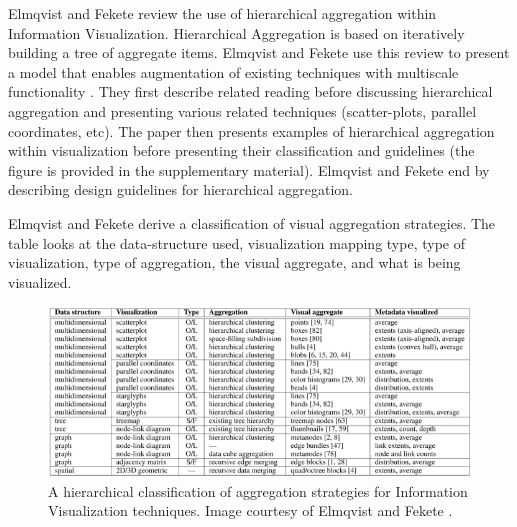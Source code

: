 Elmqvist and Fekete review the use of hierarchical aggregation within Information Visualization. Hierarchical Aggregation is based on iteratively building a tree of aggregate items. Elmqvist and Fekete use this review to present a model that enables augmentation of existing techniques with multiscale functionality \cite{elmqvist2010hierarchical}.
They first describe related reading  before discussing hierarchical aggregation and presenting various related techniques (scatter-plots, parallel coordinates, etc). The paper then presents examples of hierarchical aggregation within visualization before presenting their classification and guidelines (the figure is provided in the supplementary material). Elmqvist and Fekete end by describing design guidelines for hierarchical aggregation.

Elmqvist and Fekete derive a classification of visual aggregation strategies. The table looks at the data-structure used, visualization mapping type, type of visualization, type of aggregation, the visual  aggregate, and what is being visualized.

\begin{figure}[t]
\begin{center}
\includegraphics[width=1\textwidth]{images/elmqvist2010hierarchical}
\caption{A hierarchical classification of aggregation strategies for Information Visualization techniques. Image courtesy of Elmqvist and Fekete \cite{elmqvist2010hierarchical} .} \label{fig: elmqvist2010hierarchical}
\end{center}
\end{figure}

